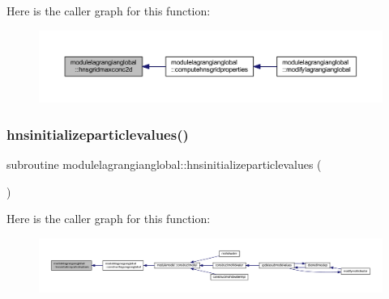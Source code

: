 Here is the caller graph for this function\+:\nopagebreak
\begin{figure}[H]
\begin{center}
\leavevmode
\includegraphics[width=350pt]{namespacemodulelagrangianglobal_ae8087b21cc2eb799dc6cc0ca8fca855a_icgraph}
\end{center}
\end{figure}
\mbox{\label{namespacemodulelagrangianglobal_a480cf2e664cf8fc186fb4ad80025693c}} 
\subsubsection{\texorpdfstring{hnsinitializeparticlevalues()}{hnsinitializeparticlevalues()}}
{\footnotesize\ttfamily subroutine modulelagrangianglobal\+::hnsinitializeparticlevalues (\begin{DoxyParamCaption}{ }\end{DoxyParamCaption})\hspace{0.3cm}{\ttfamily [private]}}

Here is the caller graph for this function\+:\nopagebreak
\begin{figure}[H]
\begin{center}
\leavevmode
\includegraphics[width=350pt]{namespacemodulelagrangianglobal_a480cf2e664cf8fc186fb4ad80025693c_icgraph}
\end{center}
\end{figure}
\mbox{\label{namespacemodulelagrangianglobal_ad1111403d5d343cacd9cf3deb4c66ec9}} 
